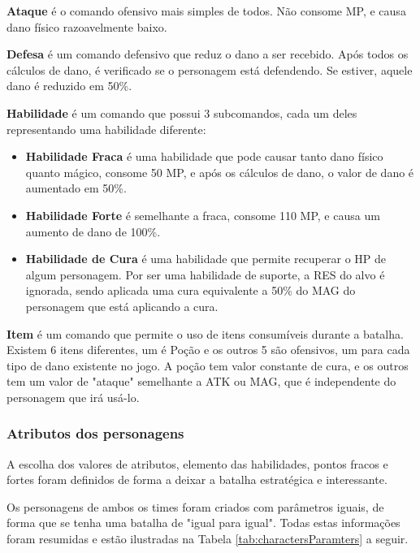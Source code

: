 \documentclass[12pt,a4paper]{article}
\begin{document}
	\textbf{Ataque} é o comando ofensivo mais simples de todos.
	Não consome MP,
	e causa dano físico razoavelmente baixo.
	
	\textbf{Defesa} é um comando defensivo que reduz o dano a ser recebido.
	Após todos os cálculos de dano,
	é verificado se o personagem está defendendo.
	Se estiver, aquele dano é reduzido em 50\%.
	
	\textbf{Habilidade} é um comando que possui 3 subcomandos,
	cada um deles representando uma habilidade diferente:
	
	\begin{itemize}[noitemsep]
    	\item \textbf{Habilidade Fraca} é uma habilidade que pode causar tanto dano físico quanto mágico,
		consome 50 MP,
		e após os cálculos de dano,
		o valor de dano é aumentado em 50\%.
    	\item \textbf{Habilidade Forte} é semelhante a fraca,
    	consome 110 MP,
		e causa um aumento de dano de 100\%.
    	\item \textbf{Habilidade de Cura} é uma habilidade que permite recuperar o HP de algum personagem.
		Por ser uma habilidade de suporte,
		a RES do alvo é ignorada,
		sendo aplicada uma cura equivalente a 50\% do MAG do personagem que está aplicando a cura.
  	\end{itemize}
	
	\textbf{Item} é um comando que permite o uso de itens consumíveis durante a batalha.
	Existem 6 itens diferentes,
	um é Poção e os outros 5 são ofensivos, um para cada tipo de dano existente no jogo.
	A poção tem valor constante de cura,
	e os outros tem um valor de "ataque"{} semelhante a ATK ou MAG,
	que é independente do personagem que irá usá-lo.
	
	\subsubsection{Atributos dos personagens}
	A escolha dos valores de atributos,
	elemento das habilidades,
	pontos fracos e fortes foram definidos de forma a deixar a batalha estratégica e interessante.

	Os personagens de ambos os times foram criados com parâmetros iguais,
	de forma que se tenha uma batalha de "igual para igual"{}.
	Todas estas informações foram resumidas
	e estão ilustradas na Tabela \ref{tab:charactersParamters} a seguir.
	
\end{document}

